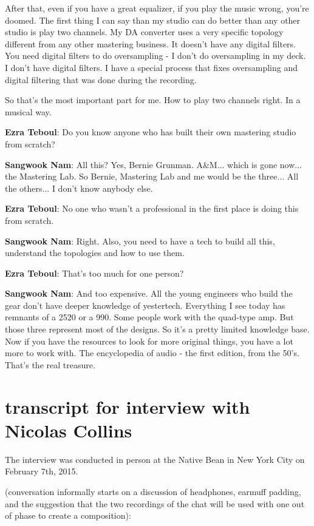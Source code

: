 After that, even if you have a great equalizer, if you play the music wrong, you're doomed. The first thing I can say than my studio can do better than any other studio is play two channels. My DA converter uses a very specific topology different from any other mastering business. It doesn't have any digital filters. You need digital filters to do oversampling - I don't do oversampling in my deck. I don't have digital filters. I have a special process that fixes oversampling and digital filtering that was done during the recording.

So that's the most important part for me. How to play two channels right. In a musical way.

\textbf{Ezra Teboul}: Do you know anyone who has built their own mastering studio from scratch?

\textbf{Sangwook Nam}: All this? Yes, Bernie Grunman. A\&M... which is gone now... the Mastering Lab. So Bernie, Mastering Lab and me would be the three... All the others... I don't know anybody else.

\textbf{Ezra Teboul}: No one who wasn't a professional in the first place is doing this from scratch.

\textbf{Sangwook Nam}: Right. Also, you need to have a tech to build all this, understand the topologies and how to use them.

\textbf{Ezra Teboul}: That's too much for one person?

\textbf{Sangwook Nam}: And too expensive. All the young engineers who build the gear don't have deeper knowledge of yestertech. Everything I see today has remnants of a 2520 or a 990. Some people work with the quad-type amp. But those three represent most of the designs. So it's a pretty limited knowledge base. Now if you have the resources to look for more original things, you have a lot more to work with. The encyclopedia of audio - the first edition, from the 50's. That's the real treasure.

\newpage

\clearpage 
\section{transcript for interview with Nicolas Collins}

The interview was conducted in person at the Native Bean in New York City on February 7th, 2015. 
					
(conversation informally starts on a discussion of headphones, earmuff padding, and the suggestion that the two recordings of the chat will be used with one out of phase to create a composition):
					
